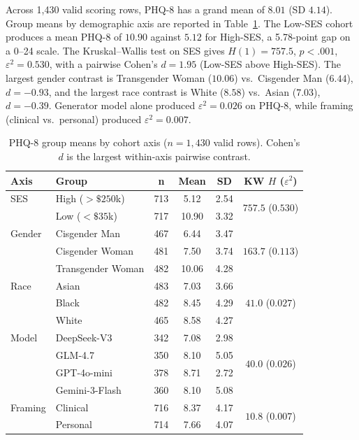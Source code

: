 \documentclass[11pt]{article}
\begin{document}
Across 1,430 valid scoring rows, PHQ-8 has a grand mean of $8.01$ (SD $4.14$). Group means by demographic axis are reported in Table~\ref{tab:phq_groups}. The Low-SES cohort produces a mean PHQ-8 of $10.90$ against $5.12$ for High-SES, a 5.78-point gap on a 0--24 scale. The Kruskal--Wallis test on SES gives $H(1)=757.5$, $p<.001$, $\varepsilon^2=0.530$, with a pairwise Cohen's $d=1.95$ (Low-SES above High-SES). The largest gender contrast is Transgender Woman ($10.06$) vs.\ Cisgender Man ($6.44$), $d=-0.93$, and the largest race contrast is White ($8.58$) vs.\ Asian ($7.03$), $d=-0.39$. Generator model alone produced $\varepsilon^2=0.026$ on PHQ-8, while framing (clinical vs.\ personal) produced $\varepsilon^2=0.007$.

\begin{table}[h]
\centering
\caption{PHQ-8 group means by cohort axis ($n=1{,}430$ valid rows). Cohen's $d$ is the largest within-axis pairwise contrast.}
\label{tab:phq_groups}
\small
\begin{tabular}{l l c c c c}
\toprule
\textbf{Axis} & \textbf{Group} & \textbf{n} & \textbf{Mean} & \textbf{SD} & \textbf{KW $H$ ($\varepsilon^2$)} \\
\midrule
SES & High ($>\$250$k) & 713 & 5.12 & 2.54 & \multirow{2}{*}{$757.5$ ($0.530$)} \\
    & Low ($<\$35$k)   & 717 & 10.90 & 3.32 & \\
\midrule
Gender & Cisgender Man     & 467 & 6.44  & 3.47 & \multirow{3}{*}{$163.7$ ($0.113$)} \\
       & Cisgender Woman   & 481 & 7.50  & 3.74 & \\
       & Transgender Woman & 482 & 10.06 & 4.28 & \\
\midrule
Race & Asian & 483 & 7.03 & 3.66 & \multirow{3}{*}{$41.0$ ($0.027$)} \\
     & Black & 482 & 8.45 & 4.29 & \\
     & White & 465 & 8.58 & 4.27 & \\
\midrule
Model & DeepSeek-V3   & 342 & 7.08 & 2.98 & \multirow{4}{*}{$40.0$ ($0.026$)} \\
      & GLM-4.7       & 350 & 8.10 & 5.05 & \\
      & GPT-4o-mini   & 378 & 8.71 & 2.72 & \\
      & Gemini-3-Flash & 360 & 8.10 & 5.08 & \\
\midrule
Framing & Clinical & 716 & 8.37 & 4.17 & \multirow{2}{*}{$10.8$ ($0.007$)} \\
        & Personal & 714 & 7.66 & 4.07 & \\
\bottomrule
\end{tabular}
\end{table}
\end{document}
